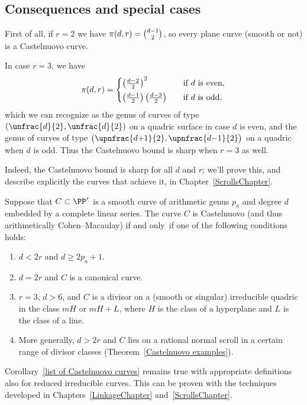 \subsection*{Consequences and special cases}

 First of all,
if
$r=2$ we have $\pi(d,r) = \tbinom{d-1}{2}$,
 so every
plane curve
(smooth or not)
is a Castelnuovo curve.
%

 In case $r=3$, we have
 $$
 \pi(d,r) =
 \begin{cases}
 \left(\frac{d-2}{2} \right)^2& \quad \text{if $d$ is even}, \\
\noalign{\vskip3pt}
 \left(\frac{d-1}{2} \right)\left(\frac{d-3}{2} \right)& \quad \text{if
 $d$ is odd},
 \end{cases}
 $$
 which we can recognize as the genus of curves of type $(\unfrac{d}{2},
 \unfrac{d}{2} )$ on a quadric surface in case $d$ is even, and the genus
 of curves of type
 $\bigl(\upnfrac{d{+}1}{2}, \upnfrac{d{-}1}{2} \bigr)$
on a quadric when $d$ is odd. Thus
the Castelnuovo bound is sharp when $r=3$ as well.

Indeed, the Castelnuovo bound is sharp for all $d$ and $r$; we'll
prove this, and describe explicitly the curves that achieve it, in
Chapter~\ref{ScrollsChapter}.


\begin{corollary}\label{list of Castelnuovo curves}
Suppose that $C\subset \PP^r$ is a smooth curve of arithmetic genus
$p_{a}$ and degree $d$ embedded by a complete linear series. The curve
$C$ is  Castelnuovo (and thus arithmetically Cohen--Macaulay) if and
only~if one of the following
conditions
holds:
\begin{enumerate}
\item  $d<2r$ and  $d \geq 2p_a+1$.
\item $d=2r$
and
$C$ is a canonical curve.
\item $r=3$, $d>6$,
and
$C$ is a divisor on a (smooth or singular)
irreducible quadric in the class $mH$ or $mH+L$, where $H$ is the class
of a hyperplane and $L$ is the class of a line.
\item  More generally,  $d>2r$
and
$C$ lies on a rational normal scroll in a certain range of divisor classes
\rm
(Theorem~\ref{Castelnuovo examples}).
\end{enumerate}
\end{corollary}

\begin{fact}
Corollary~\ref{list of Castelnuovo curves} remains true with appropriate
definitions also for reduced irreducible curves. This can be proven
with the techniques developed in Chapters~\ref{LinkageChapter}
and~\ref{ScrollsChapter}.
\end{fact}

